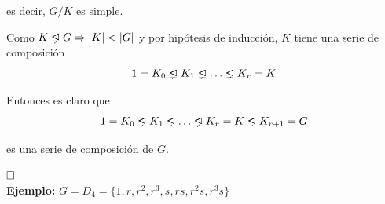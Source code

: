 \documentclass{article}
\newcommand{\unlhdneq}{%
  \mathrel{\ooalign{$\lneq$\cr\raise.22ex\hbox{$\lhd$}\cr}}}
\begin{document}
es decir, $G/K$ es simple. 

Como $K\unlhdneq G\Rightarrow|K|<|G|$ y por hipótesis de inducción, $K$ tiene una serie de composición
\begin{equation*}
1=K_0\unlhdneq K_1\unlhdneq \ldots \unlhdneq K_r=K
\end{equation*}

Entonces es claro que
\begin{equation*}
1=K_0\unlhdneq K_1\unlhdneq \ldots \unlhdneq K_r=K\unlhdneq K_{r+1}=G
\end{equation*}

es una serie de composición de $G$.

$\hfill\square$ \\

\textbf{Ejemplo:} $G=D_4=\{1,r,r^2,r^3,s,rs,r^2s,r^3s\}$
\end{document}
